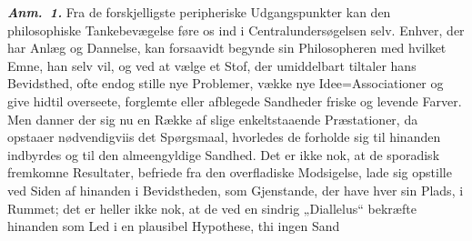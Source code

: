 \documentclass[12pt]{book}
\newcommand{\anm}[1]{\emph{\textbf{Anm.~#1.}}}
\newcommand{\opage}[1]{\marginnote{\footnotesize\textit{[#1]}}}
\begin{document}
\anm{1} Fra de forskjelligste peripheriske Udgangspunkter kan den philosophiske Tankebevægelse
føre os ind i Centralundersøgelsen selv. Enhver, der har Anlæg og Dannelse, kan forsaavidt
begynde sin Philosopheren med hvilket Emne, han selv vil, og ved at vælge et Stof, der
umiddelbart tiltaler hans Bevidsthed, ofte endog stille nye Problemer, vække nye
Idee=Associationer og give hidtil overseete, forglemte eller afblegede Sandheder friske og
levende Farver. Men danner der sig nu en Række af slige enkeltstaaende Præstationer, da
opstaaer nødvendigviis det Spørgsmaal, hvorledes de forholde sig til hinanden indbyrdes og til
den almeengyldige Sandhed. Det er ikke nok, at de sporadisk fremkomne Resultater, befriede fra
den overfladiske Modsigelse, lade sig opstille ved Siden af hinanden i Bevidstheden, som
Gjenstande, der have hver sin Plads, i Rummet; det er heller ikke nok, at de ved en sindrig
„Diallelus“ bekræfte hinanden som Led i en plausibel Hypothese, thi ingen Sand%
\opage{99}%
\end{document}
